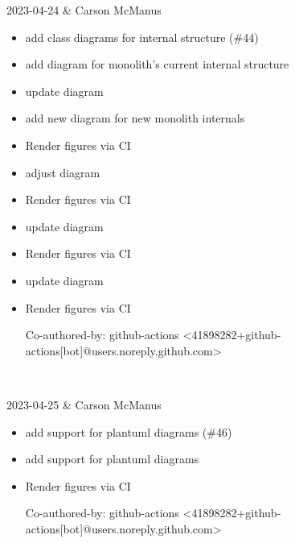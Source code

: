 2023-04-24 & Carson McManus
\begin{itemize}[topsep=0pt,itemsep=0pt,parsep=0pt,partopsep=0pt,leftmargin=12pt]
\item add class diagrams for internal structure (\#44)

\item add diagram for monolith's current internal structure

\item update diagram

\item add new diagram for new monolith internals

\item Render figures via CI

\item adjust diagram

\item Render figures via CI

\item update diagram

\item Render figures via CI

\item update diagram

\item Render figures via CI



Co-authored-by: github-actions <41898282+github-actions[bot]@users.noreply.github.com>
\end{itemize}
\\ \hline

2023-04-25 & Carson McManus
\begin{itemize}[topsep=0pt,itemsep=0pt,parsep=0pt,partopsep=0pt,leftmargin=12pt]
\item add support for plantuml diagrams (\#46)

\item add support for plantuml diagrams

\item Render figures via CI



Co-authored-by: github-actions <41898282+github-actions[bot]@users.noreply.github.com>
\end{itemize}
\\ \hline

